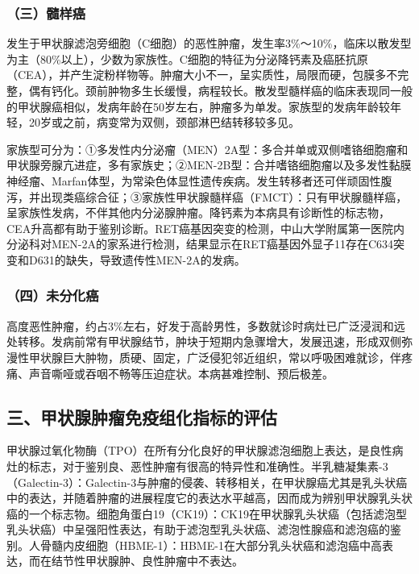 \subsubsection{（三）髓样癌}

发生于甲状腺滤泡旁细胞（C细胞）的恶性肿瘤，发生率3\%～10\%，临床以散发型为主（80\%以上），少数为家族性。C细胞的特征为分泌降钙素及癌胚抗原（CEA），并产生淀粉样物等。肿瘤大小不一，呈实质性，局限而硬，包膜多不完整，偶有钙化。颈前肿物多生长缓慢，病程较长。散发型髓样癌的临床表现同一般的甲状腺癌相似，发病年龄在50岁左右，肿瘤多为单发。家族型的发病年龄较年轻，20岁或之前，病变常为双侧，颈部淋巴结转移较多见。

家族型可分为：①多发性内分泌瘤（MEN）2A型：多合并单或双侧嗜铬细胞瘤和甲状腺旁腺亢进症，多有家族史；②MEN-2B型：合并嗜铬细胞瘤以及多发性黏膜神经瘤、Marfan体型，为常染色体显性遗传疾病。发生转移者还可伴顽固性腹泻，并出现类癌综合征；③家族性甲状腺髓样癌（FMCT）：只有甲状腺髓样癌，呈家族性发病，不伴其他内分泌腺肿瘤。降钙素为本病具有诊断性的标志物，CEA升高都有助于鉴别诊断。RET癌基因突变的检测，中山大学附属第一医院内分泌科对MEN-2A的家系进行检测，结果显示在RET癌基因外显子11存在C634突变和D631的缺失，导致遗传性MEN-2A的发病。

\subsubsection{（四）未分化癌}

高度恶性肿瘤，约占3\%左右，好发于高龄男性，多数就诊时病灶已广泛浸润和远处转移。发病前常有甲状腺结节，肿块于短期内急骤增大，发展迅速，形成双侧弥漫性甲状腺巨大肿物，质硬、固定，广泛侵犯邻近组织，常以呼吸困难就诊，伴疼痛、声音嘶哑或吞咽不畅等压迫症状。本病甚难控制、预后极差。

\subsection{三、甲状腺肿瘤免疫组化指标的评估}

甲状腺过氧化物酶（TPO）在所有分化良好的甲状腺滤泡细胞上表达，是良性病灶的标志，对于鉴别良、恶性肿瘤有很高的特异性和准确性。半乳糖凝集素-3（Galectin-3）：Galectin-3与肿瘤的侵袭、转移相关，在甲状腺癌尤其是乳头状癌中的表达，并随着肿瘤的进展程度它的表达水平越高，因而成为辨别甲状腺乳头状癌的一个标志物。细胞角蛋白19（CK19）：CK19在甲状腺乳头状癌（包括滤泡型乳头状癌）中呈强阳性表达，有助于滤泡型乳头状癌、滤泡性腺癌和滤泡癌的鉴别。人骨髓内皮细胞（HBME-1）：HBME-1在大部分乳头状癌和滤泡癌中高表达，而在结节性甲状腺肿、良性肿瘤中不表达。

